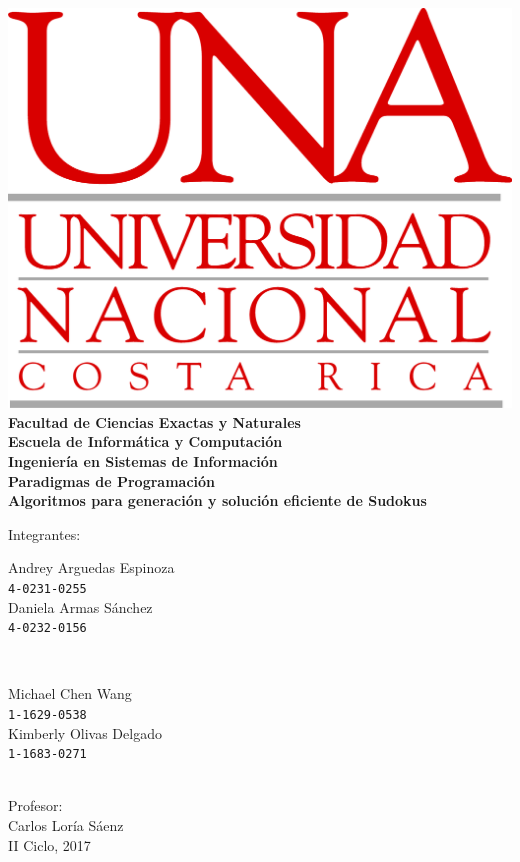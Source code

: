 \documentclass[conference]{IEEEtran}
\begin{document}
\begin{titlepage}

\centering
\includegraphics[scale=0.6]{una.png}\\[10mm]

\textbf{
    {\Large Facultad de Ciencias Exactas y Naturales\\[3mm]
    Escuela de Informática y Computación\\[3mm]
    Ingeniería en Sistemas de Información\\[3mm]
    Paradigmas de Programación}\\[15mm]
    {\LARGE Algoritmos para generación y solución eficiente de Sudokus}\\[15mm]
}

\large{Integrantes:}\\[3mm]

\begin{minipage}{0.4\textwidth}
\begin{flushleft} \large
    Andrey Arguedas Espinoza\\
    \texttt{4-0231-0255}\\
    Daniela Armas Sánchez\\
    \texttt{4-0232-0156}\\
\end{flushleft}
\end{minipage}
~
\begin{minipage}{0.4\textwidth}
\begin{flushleft} \large
    Michael Chen Wang\\
    \texttt{1-1629-0538}\\
    Kimberly Olivas Delgado\\
    \texttt{1-1683-0271}\\
\end{flushleft}
\end{minipage}\\[15mm]

\large{Profesor: \\[3mm] Carlos Loría Sáenz}\\[15mm]

\large {II Ciclo, 2017}

\end{titlepage}
\clearpage
\end{document}

